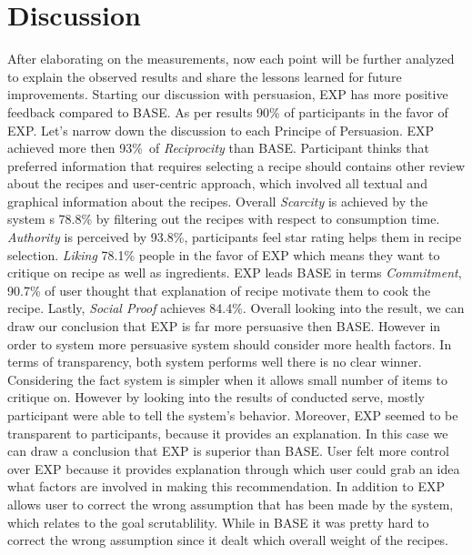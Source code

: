 \section{Discussion}
After elaborating on the measurements, now each point will be further analyzed to explain the observed results and share the lessons learned for future improvements. \newline
Starting our discussion with persuasion, EXP has more positive feedback compared to BASE. As per results 90\% of participants in the favor of EXP. Let’s narrow down the discussion to each Principe of Persuasion.  EXP achieved more then 93\%\ of \textit{Reciprocity} than BASE. Participant thinks that preferred information that requires selecting a recipe should contains other review about the recipes and user-centric approach, which involved all textual and graphical information about the recipes.  Overall \textit{Scarcity} is achieved by the system s 78.8\% by filtering out the recipes with respect to consumption time. \textit{Authority} is perceived by 93.8\%, participants feel star rating helps them in recipe selection. \textit{Liking} 78.1\% people in the favor of EXP which means they want to critique on recipe as well as ingredients. EXP leads BASE in terms \textit{Commitment}, 90.7\% of user thought that explanation of recipe motivate them to cook the recipe. Lastly, 
\textit{Social Proof} achieves 84.4\%. Overall looking into the result, we can draw our conclusion that EXP is far more persuasive then BASE. However in order to system more persuasive system should consider more health factors. \newline
In terms of transparency, both system performs well there is no clear winner. Considering the fact system is simpler when it allows small number of items to critique on. However by looking into the results of conducted serve, mostly participant were able to tell the system’s behavior. Moreover, EXP seemed to be transparent to participants, because it provides an explanation. In this case we can draw a conclusion that EXP is superior than BASE. \newline
User felt more control over EXP because it provides explanation through which user could grab an idea what factors are involved in making this recommendation. In addition to EXP allows user to correct the wrong assumption that has been made by the system, which relates to the goal scrutablility. While in BASE it was pretty hard to correct the wrong assumption since it dealt which overall weight of the recipes. \newline

